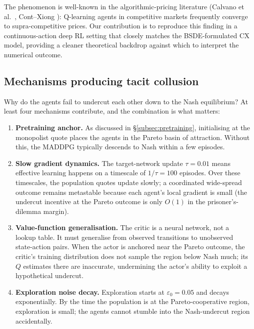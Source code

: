 The phenomenon is well-known in the algorithmic-pricing literature (Calvano et al.\ \cite{calvano2020}, Cont--Xiong \cite{cont2024}): Q-learning agents in competitive markets frequently converge to supra-competitive prices. Our contribution is to reproduce this finding in a continuous-action deep RL setting that closely matches the BSDE-formulated CX model, providing a cleaner theoretical backdrop against which to interpret the numerical outcome.

\subsection{Mechanisms producing tacit collusion}

Why do the agents fail to undercut each other down to the Nash equilibrium? At least four mechanisms contribute, and the combination is what matters:

\begin{enumerate}[leftmargin=2em,label=(M\arabic*)]
  \item \textbf{Pretraining anchor.}  As discussed in \S\ref{subsec:pretraining}, initialising at the monopolist quote places the agents in the Pareto basin of attraction. Without this, the MADDPG typically descends to Nash within a few episodes.
  \item \textbf{Slow gradient dynamics.}  The target-network update $\tau = 0.01$ means effective learning happens on a timescale of $1/\tau = 100$ episodes. Over these timescales, the population quotes update slowly; a coordinated wide-spread outcome remains metastable because each agent's local gradient is small (the undercut incentive at the Pareto outcome is only $O(1)$ in the prisoner's-dilemma margin).
  \item \textbf{Value-function generalisation.}  The critic is a neural network, not a lookup table. It must generalise from observed transitions to unobserved state-action pairs. When the actor is anchored near the Pareto outcome, the critic's training distribution does not sample the region below Nash much; its $Q$ estimates there are inaccurate, undermining the actor's ability to exploit a hypothetical undercut.
  \item \textbf{Exploration noise decay.}  Exploration starts at $\varepsilon_0 = 0.05$ and decays exponentially. By the time the population is at the Pareto-cooperative region, exploration is small; the agents cannot stumble into the Nash-undercut region accidentally.
\end{enumerate}

